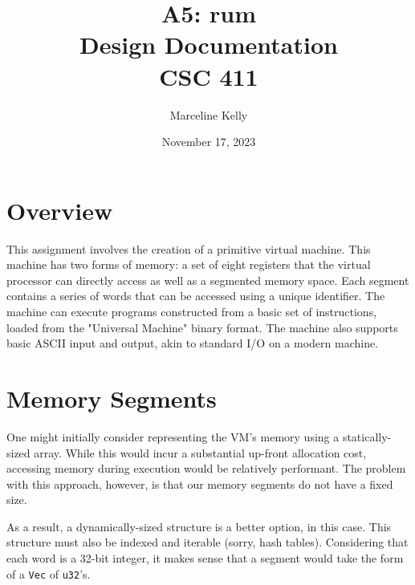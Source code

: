 \documentclass{article}
\title{\textbf{A5: rum} \\ \Large Design Documentation \\ CSC 411}
\date{November 17, 2023}
\author{Marceline Kelly}
\begin{document}
\maketitle





\section{Overview}

This assignment involves the creation of a primitive virtual machine.
This machine has two forms of memory: a set of eight registers that the virtual processor can directly access as well as a segmented memory space.
Each segment contains a series of words that can be accessed using a unique identifier.
The machine can execute programs constructed from a basic set of instructions, loaded from the "Universal Machine" binary format.
The machine also supports basic ASCII input and output, akin to standard I/O on a modern machine.

\section{Memory Segments}

One might initially consider representing the VM's memory using a statically-sized array.
While this would incur a substantial up-front allocation cost, accessing memory during execution would be relatively performant.
The problem with this approach, however, is that our memory segments do not have a fixed size.

As a result, a dynamically-sized structure is a better option, in this case.
This structure must also be indexed and iterable (sorry, hash tables).
Considering that each word is a 32-bit integer, it makes sense that a segment would take the form of a \verb|Vec| of \verb|u32|'s.
\end{document}
